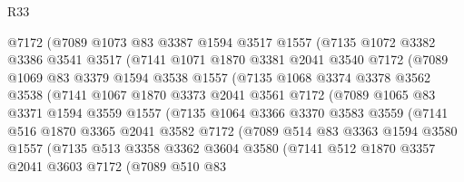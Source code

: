 \begin{lexlean}{R33}
\begin{coremodule}
            @7172
            (@7089
              @1073
              @83
              @3387
              @1594
              @3517
              @1557
              (@7135
                @1072
                @3382
                @3386
                @3541
                @3517
                (@7141
                  @1071
                  @1870
                  @3381
                  @2041
                  @3540
                  @7172
                  (@7089
                    @1069
                    @83
                    @3379
                    @1594
                    @3538
                    @1557
                    (@7135
                      @1068
                      @3374
                      @3378
                      @3562
                      @3538
                      (@7141
                        @1067
                        @1870
                        @3373
                        @2041
                        @3561
                        @7172
                        (@7089
                          @1065
                          @83
                          @3371
                          @1594
                          @3559
                          @1557
                          (@7135
                            @1064
                            @3366
                            @3370
                            @3583
                            @3559
                            (@7141
                              @516
                              @1870
                              @3365
                              @2041
                              @3582
                              @7172
                              (@7089
                                @514
                                @83
                                @3363
                                @1594
                                @3580
                                @1557
                                (@7135
                                  @513
                                  @3358
                                  @3362
                                  @3604
                                  @3580
                                  (@7141
                                    @512
                                    @1870
                                    @3357
                                    @2041
                                    @3603
                                    @7172
                                    (@7089
                                      @510
                                      @83

\end{coremodule}
\end{lexlean}

